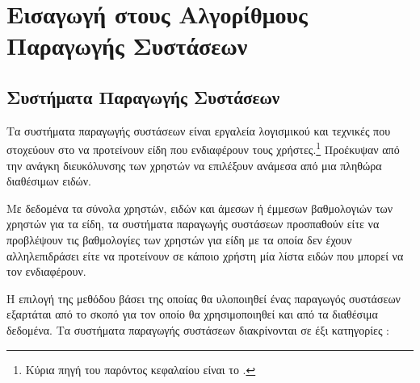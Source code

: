 \chapter{Εισαγωγή στους Αλγορίθμους Παραγωγής Συστάσεων}
\label{chap:theory}
\section{Συστήματα Παραγωγής Συστάσεων}
Τα συστήματα παραγωγής συστάσεων είναι εργαλεία λογισμικού και τεχνικές που στοχεύουν στο να προτείνουν είδη που ενδιαφέρουν τους χρήστες.\cite{ricci2011recommender}\footnote{Κύρια πηγή του παρόντος κεφαλαίου είναι το \cite{ricci2011recommender}.} Προέκυψαν από την ανάγκη διευκόλυνσης των χρηστών να επιλέξουν ανάμεσα από μια πληθώρα διαθέσιμων ειδών.\par
Με δεδομένα τα σύνολα χρηστών, ειδών και άμεσων ή έμμεσων βαθμολογιών των χρηστών για τα είδη, τα συστήματα παραγωγής συστάσεων προσπαθούν είτε να προβλέψουν τις βαθμολογίες των χρηστών για είδη με τα οποία δεν έχουν αλληλεπιδράσει είτε να προτείνουν σε κάποιο χρήστη μία λίστα ειδών που μπορεί να τον ενδιαφέρουν. \cite{Nikolakopoulos2015126} \par
Η επιλογή της μεθόδου βάσει της οποίας θα υλοποιηθεί ένας παραγωγός συστάσεων εξαρτάται από το σκοπό για τον οποίο θα χρησιμοποιηθεί και από τα διαθέσιμα δεδομένα. Τα συστήματα παραγωγής συστάσεων διακρίνονται σε έξι κατηγορίες \cite{Burke:2007:HWR:1768197.1768211}:
